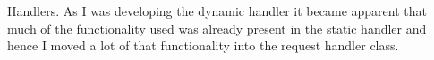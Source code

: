 
Handlers.
As I was developing the dynamic handler it became apparent that much of the
functionality used was already present in the static handler and hence I moved
a lot of that functionality into the request handler class.
